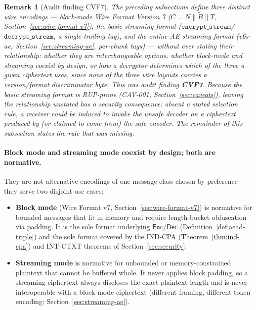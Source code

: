 \documentclass[11pt,a4paper]{article}
\newtheorem{remark}[theorem]{Remark}
\begin{document}
\begin{remark}[Audit finding CVF7]
The preceding subsections define three distinct wire encodings — block-mode
Wire Format Version 7 ($C = N \| \widetilde{B} \| T$,
Section~\ref{sec:wire-format-v7}), the basic streaming format
($\texttt{encrypt\_stream}$/$\texttt{decrypt\_stream}$, a single trailing
tag), and the online-AE streaming format (v6s-ae,
Section~\ref{sec:streaming-ae}, per-chunk tags) — without ever stating
their relationship: whether they are interchangeable options, whether
block-mode and streaming coexist by design, or how a decryptor determines
which of the three a given ciphertext uses, since none of the three wire
layouts carries a version/format discriminator byte. This was audit finding
\textbf{CVF7}. Because the basic streaming format is RUP-prone (CAV-001,
Section~\ref{sec:caveats}), leaving the relationship unstated has a security
consequence: absent a stated selection rule, a receiver could be induced to
invoke the unsafe decoder on a ciphertext produced by (or claimed to come
from) the safe encoder. The remainder of this subsection states the rule
that was missing.
\end{remark}

\paragraph{Block mode and streaming mode coexist by design; both are
normative.} They are not alternative encodings of one message class chosen
by preference — they serve two disjoint use cases:
\begin{itemize}
  \item \textbf{Block mode} (Wire Format v7, Section~\ref{sec:wire-format-v7})
        is normative for bounded messages that fit in memory and require
        length-bucket obfuscation via padding. It is the sole format
        underlying $\mathsf{Enc}/\mathsf{Dec}$
        (Definition~\ref{def:aead-triple}) and the sole format covered by
        the IND-CPA (Theorem~\ref{thm:ind-cpa}) and INT-CTXT theorems of
        Section~\ref{sec:security}.
  \item \textbf{Streaming mode} is normative for unbounded or
        memory-constrained plaintext that cannot be buffered whole. It
        never applies block padding, so a streaming ciphertext always
        discloses the exact plaintext length and is never interoperable
        with a block-mode ciphertext (different framing, different token
        encoding; Section~\ref{sec:streaming-ae}).
\end{itemize}
\end{document}
